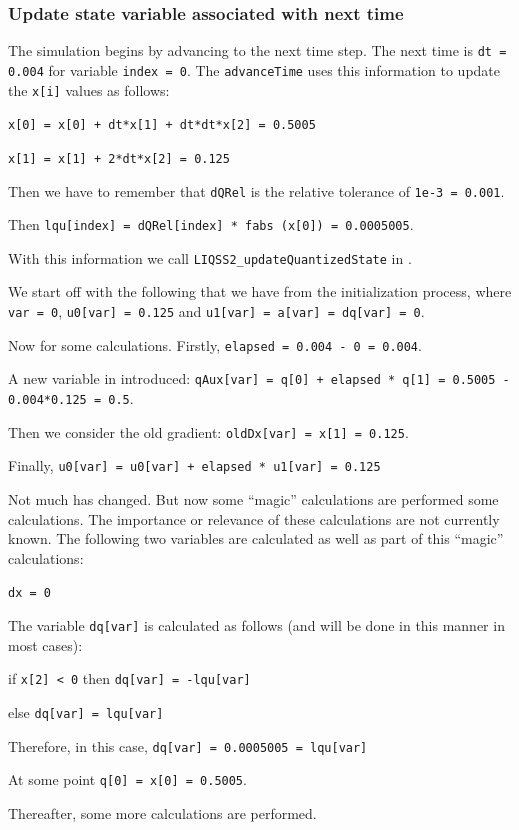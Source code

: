 \documentclass[10pt]{article}
\begin{document}
\subsubsection{Update state variable associated with next time}

The simulation begins by advancing to the next time step. The next time is {\tt{dt = 0.004}} for variable {\tt{index = 0}}. The {\tt{advanceTime}} uses this information to update the {\tt{x[i]}} values as follows:

{\tt{x[0] = x[0] + dt*x[1] + dt*dt*x[2]} = 0.5005}

{\tt{x[1] = x[1] + 2*dt*x[2] = 0.125}}

Then we have to remember that {\tt{dQRel}} is the relative tolerance of {\tt{1e-3 = 0.001}}.

Then {\tt{lqu[index] = dQRel[index] * fabs (x[0]) = 0.0005005}}.

With this information we call {\tt{LIQSS2\_updateQuantizedState}} in {}.

We start off with the following that we have from the initialization process, where {\tt{var = 0}}, {\tt{u0[var] = 0.125}} and {\tt{u1[var] = a[var] = dq[var] = 0}}.

Now for some calculations. Firstly, {\tt{elapsed = 0.004 - 0 = 0.004}}.

A new variable in introduced: {\tt{qAux[var] = q[0] + elapsed * q[1] = 0.5005 - 0.004*0.125 = 0.5}}.

Then we consider the old gradient: {\tt{oldDx[var] = x[1] = 0.125}}.

Finally, {\tt{u0[var] = u0[var] + elapsed * u1[var] = 0.125}}

Not much has changed. But now some {\color{red} ``magic'' calculations} are performed some calculations. The importance or relevance of these calculations are not currently known. The following two variables are calculated as well as part of this ``magic'' calculations:

{\tt{dx = 0}}

The variable {\tt{dq[var]}} is calculated as follows (and will be done in this manner in most cases):

if {\tt{x[2] < 0}} then  {\tt{dq[var] = -lqu[var]}}

else {\tt{dq[var] = lqu[var]}}


Therefore, in this case, {\tt{dq[var] = 0.0005005 = lqu[var]}}

At some point {\tt{q[0] = x[0] = 0.5005}}.

Thereafter, some more calculations are performed.
\end{document}
